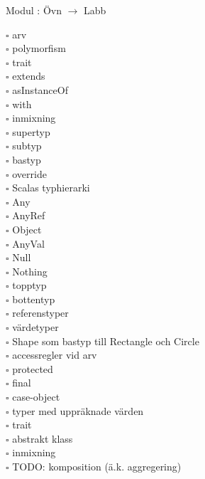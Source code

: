 
    Modul : Övn  $\rightarrow$ Labb 
    \begin{multicols}{3}\SlideFontTiny
    $\square$ arv \\
$\square$ polymorfism \\
$\square$ trait \\
$\square$ extends \\
$\square$ asInstanceOf \\
$\square$ with \\
$\square$ inmixning \\
$\square$ supertyp \\
$\square$ subtyp \\
$\square$ bastyp \\
$\square$ override \\
$\square$ Scalas typhierarki \\
$\square$ Any \\
$\square$ AnyRef \\
$\square$ Object \\
$\square$ AnyVal \\
$\square$ Null \\
$\square$ Nothing \\
$\square$ topptyp \\
$\square$ bottentyp \\
$\square$ referenstyper \\
$\square$ värdetyper \\
$\square$ Shape som bastyp till Rectangle och Circle \\
$\square$ accessregler vid arv \\
$\square$ protected \\
$\square$ final \\
$\square$ case-object \\
$\square$ typer med uppräknade värden \\
$\square$ trait \\
$\square$ abstrakt klass \\
$\square$ inmixning \\
$\square$ TODO: komposition (ä.k. aggregering) \\
    \end{multicols}
    
